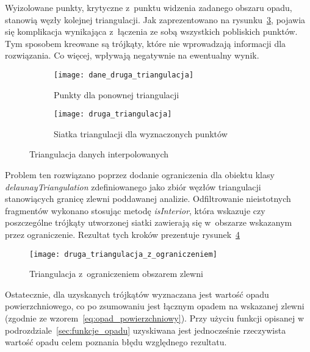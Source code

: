 Wyizolowane punkty, krytyczne z~punktu widzenia zadanego obszaru opadu, stanowią węzły kolejnej triangulacji. Jak zaprezentowano na rysunku~\ref{fig:druga_triangulacja}, pojawia się komplikacja wynikająca z~łączenia ze sobą wszystkich pobliskich punktów. Tym sposobem kreowane są trójkąty, które nie wprowadzają informacji dla rozwiązania. Co więcej, wpływają negatywnie na ewentualny wynik.

\begin{figure}[!ht]
	\centering
\begin{subfigure}{1\textwidth}
	\centering
	\texttt{[image: dane\_druga\_triangulacja]}
	\caption{Punkty dla ponownej triangulacji}
	\label{fig:dane_druga_triangulacja}
\end{subfigure}	
	\begin{subfigure}{1\textwidth}
	\centering
	\texttt{[image: druga\_triangulacja]}
	\caption{Siatka triangulacji dla wyznaczonych punktów}
\label{fig:druga_triangulacja}	
\end{subfigure}	
\caption{Triangulacja danych interpolowanych}
\end{figure}

Problem ten rozwiązano poprzez dodanie ograniczenia dla obiektu klasy \textit{delaunayTriangulation} zdefiniowanego jako zbiór węzłów triangulacji stanowiących granicę zlewni poddawanej analizie. Odfiltrowanie nieistotnych fragmentów wykonano stosując metodę \textit{isInterior}, która wskazuje czy poszczególne trójkąty utworzonej siatki zawierają się w~obszarze wskazanym przez ograniczenie. Rezultat tych kroków prezentuje rysunek~\ref{fig:druga_triangulacja_ograniczenie}

\begin{figure}[!ht]
	\centering
	\texttt{[image: druga\_triangulacja\_z\_ograniczeniem]}
	\caption{Triangulacja z~ograniczeniem obszarem zlewni}
	\label{fig:druga_triangulacja_ograniczenie}
\end{figure}

Ostatecznie, dla uzyskanych trójkątów wyznaczana jest wartość opadu powierzchniowego, co po zsumowaniu jest łącznym opadem na wskazanej zlewni (zgodnie ze wzorem~\ref{eq:opad_powierzchniowy}). Przy użyciu funkcji opisanej w podrozdziale~\ref{sec:funkcje_opadu} uzyskiwana jest jednocześnie rzeczywista wartość opadu celem poznania błędu względnego rezultatu.